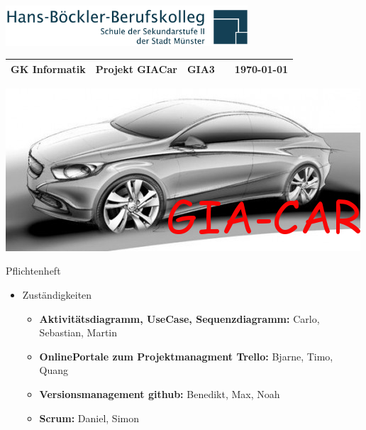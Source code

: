 \documentclass[11pt,a4paper]{letter}
\begin{document}
\raggedleft\includegraphics[height=1.5cm]{images/hbbk-logo.png}
\\
\begin{tabular}{p{4cm} p{5cm} p{1.5cm} p{1.5cm} p{3cm}}
  \tabularnewline
  \textbf{GK Informatik} & \textbf{Projekt GIACar}    & GIA3    &  & {\today} \tabularnewline 
  \hline
\end{tabular}






\centering
\includegraphics[width=0.7\linewidth]{./images/GIAcar}


\centering\Huge{Pflichtenheft} \\


\normalsize
\begin{itemize}

\item Zuständigkeiten
\begin{itemize}
\item \textbf{Aktivitätsdiagramm, UseCase, Sequenzdiagramm:} Carlo, Sebastian, Martin
\item \textbf{OnlinePortale zum Projektmanagment Trello:} Bjarne, Timo, Quang
\item \textbf{Versionsmanagement github:} Benedikt, Max, Noah
\item \textbf{Scrum:} Daniel, Simon
\end{itemize}


\end{itemize}
\end{document}
